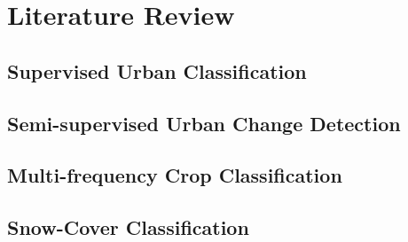 \chapter{Literature Review}


\section{Supervised Urban Classification}    

\section{Semi-supervised Urban Change Detection} 


\section{Multi-frequency Crop Classification } 

\section{Snow-Cover Classification}
